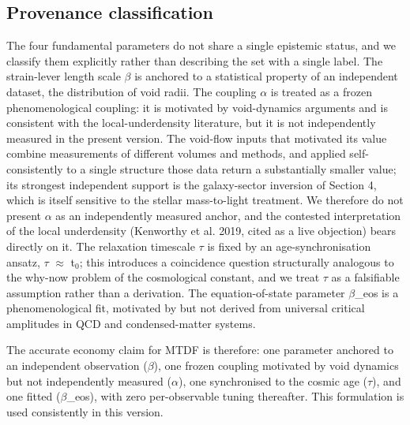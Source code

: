\documentclass[11pt,a4paper]{article}
\begin{document}
\subsection{Provenance classification}
The four fundamental parameters do not share a single epistemic status, and we classify them explicitly rather than describing the set with a single label. The strain-lever length scale $\beta$ is anchored to a statistical property of an independent dataset, the distribution of void radii. The coupling $\alpha$ is treated as a frozen phenomenological coupling: it is motivated by void-dynamics arguments and is consistent with the local-underdensity literature, but it is not independently measured in the present version. The void-flow inputs that motivated its value combine measurements of different volumes and methods, and applied self-consistently to a single structure those data return a substantially smaller value; its strongest independent support is the galaxy-sector inversion of Section 4, which is itself sensitive to the stellar mass-to-light treatment. We therefore do not present $\alpha$ as an independently measured anchor, and the contested interpretation of the local underdensity (Kenworthy et al. 2019, cited as a live objection) bears directly on it. The relaxation timescale $\tau$ is fixed by an age-synchronisation ansatz, $\tau$ $\approx$ t$_{0}$; this introduces a coincidence question structurally analogous to the why-now problem of the cosmological constant, and we treat $\tau$ as a falsifiable assumption rather than a derivation. The equation-of-state parameter $\beta$\_\allowbreak{}eos is a phenomenological fit, motivated by but not derived from universal critical amplitudes in QCD and condensed-matter systems.

The accurate economy claim for MTDF is therefore: one parameter anchored to an independent observation ($\beta$), one frozen coupling motivated by void dynamics but not independently measured ($\alpha$), one synchronised to the cosmic age ($\tau$), and one fitted ($\beta$\_\allowbreak{}eos), with zero per-observable tuning thereafter. This formulation is used consistently in this version.
\end{document}
